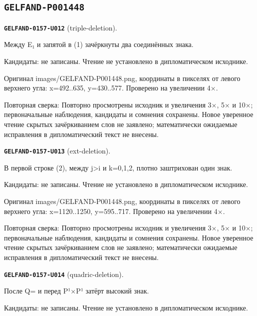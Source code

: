 \subsection*{\texttt{GELFAND-P001448}}
\par\noindent\leavevmode{}\label{GELFAND-0157-U012}\label{GELFAND-P001448:triple-deletion}\textbf{\texttt{GELFAND-0157-U012}} (triple-deletion).\nopagebreak[4]\par
Между E₁ и запятой в (1) зачёркнуты два соединённых знака.\par
Кандидаты: не записаны. Чтение не установлено в дипломатическом исходнике.\par
Оригинал images/GELFAND-P001448.png, координаты в пикселях от левого верхнего угла: x=492..635, y=430..577. Проверено на увеличении 4×.\par
Повторная сверка: Повторно просмотрены исходник и увеличения 3×, 5× и 10×; первоначальные наблюдения, кандидаты и сомнения сохранены. Новое уверенное чтение скрытых зачёркиванием слов не заявлено; математически ожидаемые исправления в дипломатический текст не внесены.\par\medskip
\par\noindent\leavevmode{}\label{GELFAND-0157-U013}\label{GELFAND-P001448:ext-deletion}\textbf{\texttt{GELFAND-0157-U013}} (ext-deletion).\nopagebreak[4]\par
В первой строке (2), между j>i и k=0,1,2, плотно заштрихован один знак.\par
Кандидаты: не записаны. Чтение не установлено в дипломатическом исходнике.\par
Оригинал images/GELFAND-P001448.png, координаты в пикселях от левого верхнего угла: x=1120..1250, y=595..717. Проверено на увеличении 4×.\par
Повторная сверка: Повторно просмотрены исходник и увеличения 3×, 5× и 10×; первоначальные наблюдения, кандидаты и сомнения сохранены. Новое уверенное чтение скрытых зачёркиванием слов не заявлено; математически ожидаемые исправления в дипломатический текст не внесены.\par\medskip
\par\noindent\leavevmode{}\label{GELFAND-0157-U014}\label{GELFAND-P001448:quadric-deletion}\textbf{\texttt{GELFAND-0157-U014}} (quadric-deletion).\nopagebreak[4]\par
После Q= и перед P¹×P¹ затёрт высокий знак.\par
Кандидаты: не записаны. Чтение не установлено в дипломатическом исходнике.\par
